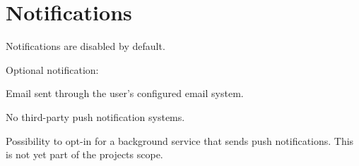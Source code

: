 
\chapter{Notifications}

Notifications are disabled by default.

Optional notification:

Email sent through the user's configured email system.

No third-party push notification systems.

Possibility to opt-in for a background service that sends push notifications. This is not yet part of the projects scope.


\sentinelchapterend
